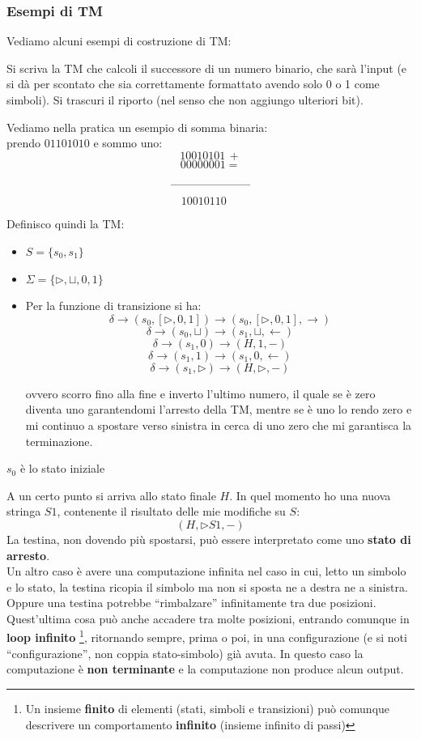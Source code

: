 \subsubsection{Esempi di TM}
Vediamo alcuni esempi di costruzione di TM:
\begin{esempio}
  Si scriva la TM che calcoli il successore di un numero binario, che sarà
  l'input (e si dà per scontato che sia correttamente formattato avendo solo 0 o
  1 come simboli). Si trascuri il riporto (nel senso che non aggiungo ulteriori
  bit).\\
  \begin{shaded}
    Vediamo nella pratica un esempio di somma binaria:\\
    prendo $01101010$ e sommo uno:
    \[10010101 \, +\]
    \[00000001=\]
    \[\rule{70pt}{.4pt}\]
    \[10010110\,\,\,\,\,\,\,\]
  \end{shaded}
  Definisco quindi la TM:
  \begin{itemize}
    \item $S=\{s_0,s_1\}$
    \item $\Sigma =\{\triangleright, \sqcup, 0,1\}$
    \item Per la funzione di transizione si ha:
    \[\delta\to(s_0,[\triangleright, 0,1])\to(s_0,[\triangleright, 0,1],
      \rightarrow)\]
    \[\delta\to(s_0,\sqcup)\to(s_1,\sqcup,\leftarrow)\]
    \[\delta\to(s_1,0)\to(H,1,-)\]
    \[\delta\to(s_1,1)\to(s_1,0,\leftarrow)\]
    \[\delta\to(s_1,\triangleright)\to(H,\triangleright,-)\]

    ovvero scorro fino alla fine e inverto l'ultimo numero, il quale se è zero diventa uno garantendomi 
    l'arresto della TM, mentre se è uno lo rendo zero e mi continuo a spostare verso sinistra in cerca di
    uno zero che mi garantisca la terminazione.
  \end{itemize}
    \item $s_0$ è lo stato iniziale
\end{esempio}
A un certo punto si arriva allo stato finale $H$. In quel momento ho
una nuova stringa $S1$, contenente il risultato delle mie modifiche su $S$:
\[(H,\triangleright S1, -)\]
La testina, non dovendo più spostarsi, può essere interpretato come uno \textbf{stato di arresto}.\\
Un altro caso è avere una computazione infinita nel caso in cui, letto un
simbolo e lo stato, la testina ricopia il simbolo ma non si sposta ne a destra
ne a sinistra. Oppure una testina potrebbe ``rimbalzare'' infinitamente tra due
posizioni. Quest'ultima cosa può anche accadere tra molte posizioni, entrando
comunque in \textbf{loop infinito} \footnote{Un insieme \textbf{finito} di elementi (stati, simboli e transizioni) può comunque descrivere un comportamento \textbf{infinito} (insieme infinito di passi)}, ritornando sempre, prima o poi, in una
configurazione (e si noti ``configurazione'', non coppia stato-simbolo) già
avuta. In questo caso la computazione è \textbf{non terminante} e la
computazione non produce alcun output. \\

